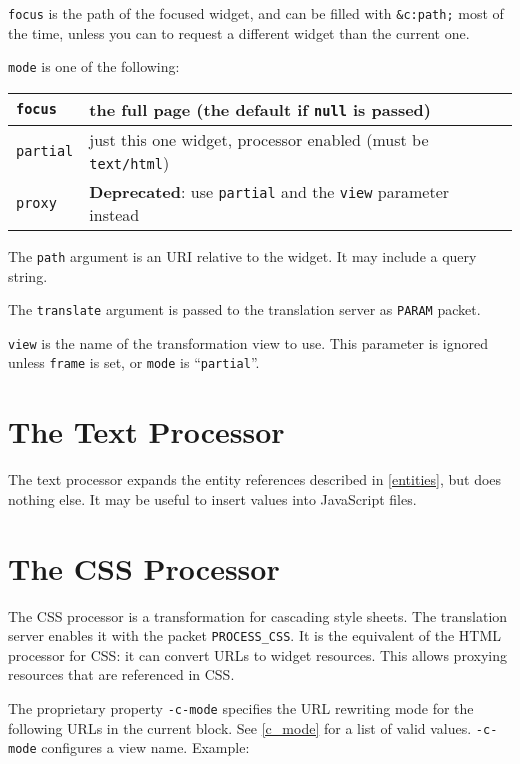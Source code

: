 \documentclass[a4paper,12pt]{article}
\begin{document}
\texttt{focus} is the path of the focused widget, and can be filled
with \texttt{\&c:path;} most of the time, unless you can to request a
different widget than the current one.

\texttt{mode} is one of the following:

\begin{longtable}{|l|p{11cm}|}
\hline

\texttt{focus} & the full page (the default if \texttt{null} is
passed) \\

\hline

\texttt{partial} & just this one widget, processor enabled (must be
\texttt{text/html}) \\

\hline
\texttt{proxy} &
\textbf{Deprecated}: use \texttt{partial} and the \texttt{view}
parameter instead \\
\hline
\end{longtable}

The \texttt{path} argument is an URI relative to the widget.  It may
include a query string.

The \texttt{translate} argument is passed to the translation server as
\texttt{PARAM} packet.

\texttt{view} is the name of the transformation view to use.  This
parameter is ignored unless \texttt{frame} is set, or \texttt{mode} is
``\texttt{partial}''.


\section{The Text Processor}
\label{textprocessor}

The text processor expands the entity references described in
\ref{entities}, but does nothing else.  It may be useful to insert
values into JavaScript files.


\section{The CSS Processor}
\label{cssprocessor}

The CSS processor is a transformation for cascading style sheets.  The
translation server enables it with the packet \verb|PROCESS_CSS|.
It is the equivalent of the HTML processor for CSS: it can convert
URLs to widget resources.  This allows proxying resources that are
referenced in CSS.

The proprietary property \texttt{-c-mode} specifies the URL rewriting
mode for the following URLs in the current block.  See \ref{c_mode}
for a list of valid values.  \texttt{-c-mode} configures a view name.
Example:
\end{document}
